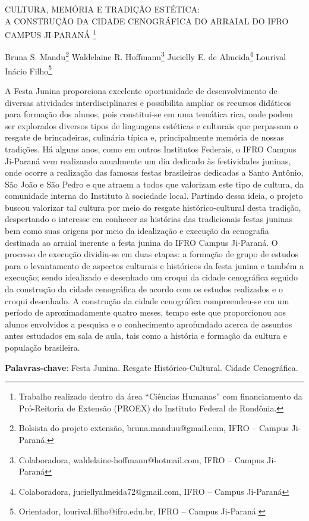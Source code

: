 \documentclass[article,12pt,onesidea,4paper,english,brazil]{abntex2}
\begin{document}
	
	
	\frenchspacing 
	
	\begin{center}
		\LARGE CULTURA, MEMÓRIA E TRADIÇÃO ESTÉTICA:\\A CONSTRUÇÃO DA CIDADE CENOGRÁFICA DO ARRAIAL DO IFRO CAMPUS JI-PARANÁ \footnote{Trabalho realizado dentro da área “Ciências Humanas” com financiamento da Pró-Reitoria de Extensão (PROEX) do Instituto Federal de Rondônia.}
		
		\normalsize
		Bruna S. Mandu\footnote{Bolsista do projeto extensão, bruna.manduu@gmail.com, IFRO – Campus Ji-Paraná,} 
		Waldelaine R. Hoffmann\footnote{Colaboradora, waldelaine-hoffmann@hotmail.com, IFRO – Campus Ji-Paraná} 
		Jucielly E. de Almeida\footnote{Colaboradora, juciellyalmeida72@gmail.com, IFRO – Campus Ji-Paraná} 
		Lourival Inácio Filho\footnote{Orientador, lourival.filho@ifro.edu.br, IFRO – Campus Ji-Paraná.} 
	\end{center}
	
	\noindent A Festa Junina proporciona excelente oportunidade de desenvolvimento de diversas atividades interdisciplinares e possibilita ampliar os recursos didáticos para formação dos alunos, pois constitui-se em uma temática rica, onde podem ser explorados diversos tipos de linguagens estéticas e culturais que perpassam o resgate de brincadeiras, culinária típica e, principalmente memória de nossas tradições. Há alguns anos, como em outros Institutos Federais, o IFRO Campus Ji-Paraná vem realizando anualmente um dia dedicado às festividades juninas, onde ocorre a realização das famosas festas brasileiras dedicadas a Santo Antônio, São João e São Pedro e que atraem a todos que valorizam este tipo de cultura, da comunidade interna do Instituto à sociedade local. Partindo dessa ideia, o projeto buscou valorizar tal cultura por meio do resgate histórico-cultural desta tradição, despertando o interesse em conhecer as histórias das tradicionais festas juninas bem como suas origens por meio da idealização e execução da cenografia destinada ao arraial inerente a festa junina do IFRO Campus Ji-Paraná. O processo de execução dividiu-se em duas etapas: a formação de grupo de estudos para o levantamento de aspectos culturais e históricos da festa junina e também a execução; sendo idealizado e desenhado um croqui da cidade cenográfica seguido da construção da cidade cenográfica de acordo com os estudos realizados e o croqui desenhado. A construção da cidade cenográfica compreendeu-se em um período de aproximadamente quatro meses, tempo este que proporcionou aos alunos envolvidos a pesquisa e o conhecimento aprofundado acerca de assuntos antes estudados em sala de aula, tais como a história e formação da cultura e população brasileira.
	
	\vspace{\onelineskip}
	
	\noindent
	\textbf{Palavras-chave}: Festa Junina. Resgate Histórico-Cultural. Cidade Cenográfica.
	
\end{document}
